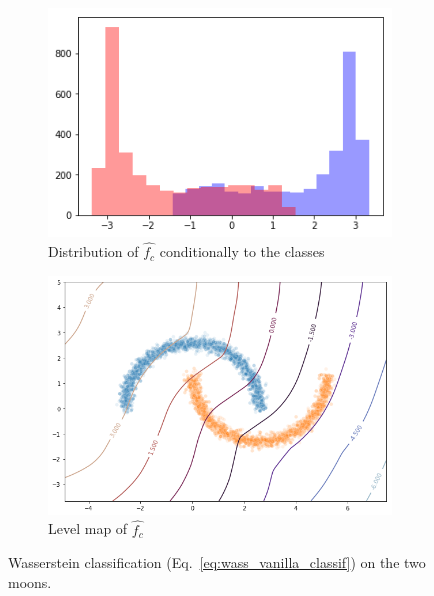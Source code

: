 \documentclass{article}
\begin{document}
\begin{figure}
\centering
\begin{subfigure}{.5\textwidth}
  \centering
  \includegraphics[width=1\linewidth]{img/wass_2moons_dist.png}
  \caption{Distribution of $\hat{f_c}$ conditionally to the classes}
  \label{wass:sub1}
\end{subfigure}%
\begin{subfigure}{.5\textwidth}
  \centering
  \includegraphics[width=1\linewidth]{img/wass_2moons_class.png}
  \caption{Level map of $\hat{f_c}$}
  \label{wass:sub2}
\end{subfigure}
\caption{Wasserstein classification (Eq.~\eqref{eq:wass_vanilla_classif}) on the two moons.}
\label{fig:wass}
\end{figure}
\end{document}
